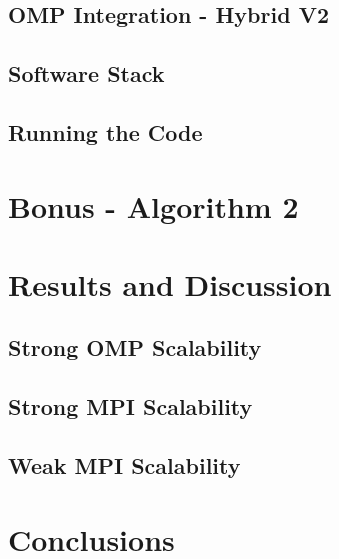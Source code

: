 \documentclass{report}
\begin{document}
\subsection{OMP Integration - Hybrid V2}

\subsection{Software Stack}
\subsection{Running the Code}

\section{Bonus - Algorithm 2}
\section{Results and Discussion}

\subsection{Strong OMP Scalability}
\subsection{Strong MPI Scalability}
\subsection{Weak MPI Scalability}

\section{Conclusions}

\printbibliography
\end{document}
